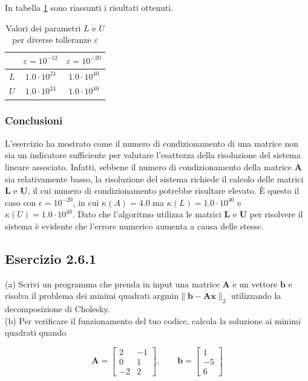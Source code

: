 \documentclass[letterpaper, 12pt]{article}
\begin{document}
In tabella \ref{tab:LU_epsilon} sono riassunti i risultati ottenuti.

\begin{table}[h!]
\centering
\caption{Valori dei parametri \( L \) e \( U \) per diverse tolleranze \( \varepsilon \)}
\label{tab:LU_epsilon}
\begin{tabular}{|c|c|c|}
\hline
 & \( \varepsilon = 10^{-12} \) & \( \varepsilon = 10^{-20} \) \\
\hline
\( L \) & $1.0 \cdot 10^{24}$ & $1.0 \cdot 10^{40}$ \\
\( U \) & $1.0 \cdot 10^{24}$ & $1.0 \cdot 10^{40}$ \\
\hline
\end{tabular}
\end{table}

\subsubsection{Conclusioni}
L'esercizio ha mostrato come il numero di condizionamento di una matrice non sia un indicatore sufficiente per
valutare l'esattezza della risoluzione del sistema lineare associato. Infatti, sebbene il numero di condizionamento
della matrice $\mathbf{A}$ sia relativamente basso, la risoluzione del sistema richiede il calcolo delle matrici
$\mathbf{L}$ e $\mathbf{U}$, il cui numero di condizionamento potrebbe risultare elevato. È questo il caso
con $\epsilon = 10^{-20}$, in cui $\kappa(A) =  4.0$ ma $\kappa(L) = 1.0 \cdot 10^{40}$ e 
$\kappa(U) = 1.0 \cdot 10^{40}$. Dato che l'algoritmo utilizza le matrici $\mathbf{L}$ e $\mathbf{U}$ 
per risolvere il sistema è evidente che l'errore numerico aumenta a causa delle stesse.

\subsection{Esercizio 2.6.1}
(a) Scrivi un programma che prenda in input una matrice $\mathbf{A}$ e un vettore $\mathbf{b}$ e risolva 
il problema dei minimi quadrati $\text{argmin}\| \mathbf{b}- \mathbf{A} \mathbf{x}\|_2$ utilizzando la decomposizione di Cholesky.\\
(b) Per verificare il funzionamento del tuo codice, calcola la soluzione ai minimi quadrati quando
\begin{center}
    \begin{minipage}{0.48\textwidth}
    \centering
    \[
    \mathbf{A} = \begin{bmatrix}
      2 & -1 \\
      0 & 1 \\
      -2 & 2
    \end{bmatrix}, \qquad
    \mathbf{b} = \begin{bmatrix}
      1 \\ -5 \\ 6
    \end{bmatrix}
    \]
    \end{minipage}
\end{center}
\end{document}
